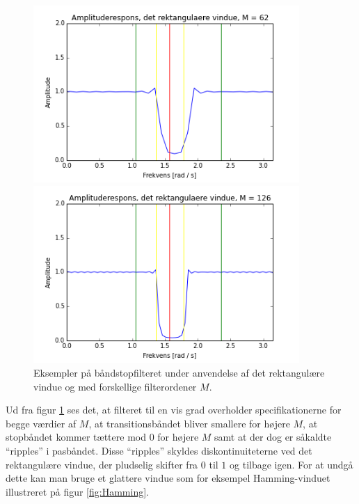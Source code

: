 \begin{figure}[H]
\begin{minipage}{0.49\textwidth}
\includegraphics[width=0.9\textwidth]{figures/Filter/Filter_rekt_62.PNG}
\end{minipage}
\begin{minipage}{0.49\textwidth}
\includegraphics[width=0.9\textwidth]{figures/Filter/Filter_rekt_126.PNG}
\end{minipage}
\caption{Eksempler på båndstopfilteret under anvendelse af det rektangulære vindue og med forskellige filterordener $M$.}
\label{fig:filter_rekt}
\end{figure}

Ud fra figur \ref{fig:filter_rekt} ses det, at filteret til en vis grad overholder specifikationerne for begge værdier af $M$, at transitionsbåndet bliver smallere for højere $M$, at stopbåndet kommer tættere mod 0 for højere $M$ samt at der dog er såkaldte ``ripples'' i pasbåndet. Disse ``ripples'' skyldes diskontinuiteterne ved det rektangulære vindue, der pludselig skifter fra $0$ til $1$ og tilbage igen. For at undgå dette kan man bruge et glattere vindue som for eksempel Hamming-vinduet illustreret på figur \ref{fig:Hamming}.

